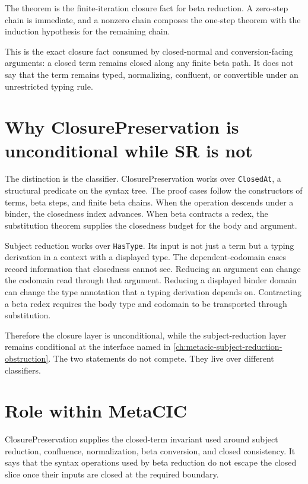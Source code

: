 The theorem is the finite-iteration closure fact for beta reduction. A
zero-step chain is immediate, and a nonzero chain composes the one-step theorem
with the induction hypothesis for the remaining chain.

This is the exact closure fact consumed by closed-normal and conversion-facing
arguments: a closed term remains closed along any finite beta path. It does
not say that the term remains typed, normalizing, confluent, or convertible
under an unrestricted typing rule.

\section{Why ClosurePreservation is unconditional while SR is not}
\label{sec:metacic-closure-preservation-audit-map-unconditional-sr}

The distinction is the classifier. ClosurePreservation works over
\texttt{ClosedAt}, a structural predicate on the syntax tree. The proof cases
follow the constructors of terms, beta steps, and finite beta chains. When the
operation descends under a binder, the closedness index advances. When beta
contracts a redex, the substitution theorem supplies the closedness budget for
the body and argument.

Subject reduction works over \texttt{HasType}. Its input is not just a term but
a typing derivation in a context with a displayed type. The dependent-codomain
cases record information that closedness cannot see. Reducing an argument can
change the codomain read through that argument. Reducing a displayed binder
domain can change the type annotation that a typing derivation depends on.
Contracting a beta redex requires the body type and codomain to be transported
through substitution.

Therefore the closure layer is unconditional, while the subject-reduction
layer remains conditional at the interface named in
\autoref{ch:metacic-subject-reduction-obstruction}. The two statements do not
compete. They live over different classifiers.

\section{Role within MetaCIC}
\label{sec:metacic-closure-preservation-audit-map-role}

ClosurePreservation supplies the closed-term invariant used around subject
reduction, confluence, normalization, beta conversion, and closed consistency.
It says that the syntax operations used by beta reduction do not escape the
closed slice once their inputs are closed at the required boundary.

